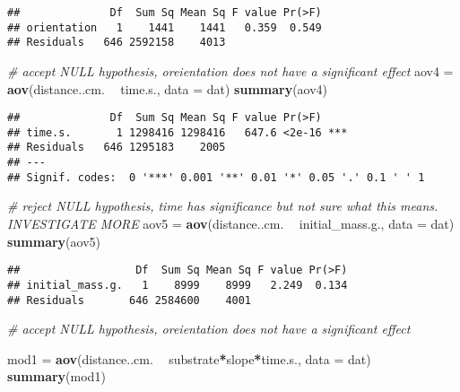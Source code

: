 \documentclass[]{article}
\newenvironment{Shaded}{\begin{snugshade}}{\end{snugshade}}
\newcommand{\CommentTok}[1]{\textcolor[rgb]{0.56,0.35,0.01}{\textit{#1}}}
\newcommand{\DataTypeTok}[1]{\textcolor[rgb]{0.13,0.29,0.53}{#1}}
\newcommand{\KeywordTok}[1]{\textcolor[rgb]{0.13,0.29,0.53}{\textbf{#1}}}
\newcommand{\NormalTok}[1]{#1}
\newcommand{\OperatorTok}[1]{\textcolor[rgb]{0.81,0.36,0.00}{\textbf{#1}}}
\newcommand{\StringTok}[1]{\textcolor[rgb]{0.31,0.60,0.02}{#1}}
\begin{document}
\begin{verbatim}
##              Df  Sum Sq Mean Sq F value Pr(>F)
## orientation   1    1441    1441   0.359  0.549
## Residuals   646 2592158    4013
\end{verbatim}

\begin{Shaded}
\begin{Highlighting}[]
\CommentTok{# accept NULL hypothesis, oreientation does not have a significant effect}
\NormalTok{aov4 =}\StringTok{ }\KeywordTok{aov}\NormalTok{(distance..cm. }\OperatorTok{~}\StringTok{ }\NormalTok{time.s., }\DataTypeTok{data =}\NormalTok{ dat)}
\KeywordTok{summary}\NormalTok{(aov4)}
\end{Highlighting}
\end{Shaded}

\begin{verbatim}
##              Df  Sum Sq Mean Sq F value Pr(>F)    
## time.s.       1 1298416 1298416   647.6 <2e-16 ***
## Residuals   646 1295183    2005                   
## ---
## Signif. codes:  0 '***' 0.001 '**' 0.01 '*' 0.05 '.' 0.1 ' ' 1
\end{verbatim}

\begin{Shaded}
\begin{Highlighting}[]
\CommentTok{# reject NULL hypothesis, time has significance but not sure what this means. INVESTIGATE MORE}
\NormalTok{aov5 =}\StringTok{ }\KeywordTok{aov}\NormalTok{(distance..cm. }\OperatorTok{~}\StringTok{ }\NormalTok{initial_mass.g., }\DataTypeTok{data =}\NormalTok{ dat)}
\KeywordTok{summary}\NormalTok{(aov5)}
\end{Highlighting}
\end{Shaded}

\begin{verbatim}
##                  Df  Sum Sq Mean Sq F value Pr(>F)
## initial_mass.g.   1    8999    8999   2.249  0.134
## Residuals       646 2584600    4001
\end{verbatim}

\begin{Shaded}
\begin{Highlighting}[]
\CommentTok{# accept NULL hypothesis, oreientation does not have a significant effect}

\NormalTok{mod1 =}\StringTok{ }\KeywordTok{aov}\NormalTok{(distance..cm. }\OperatorTok{~}\StringTok{ }\NormalTok{substrate}\OperatorTok{*}\NormalTok{slope}\OperatorTok{*}\NormalTok{time.s., }\DataTypeTok{data =}\NormalTok{ dat)}
\KeywordTok{summary}\NormalTok{(mod1)}
\end{Highlighting}
\end{Shaded}
\end{document}
